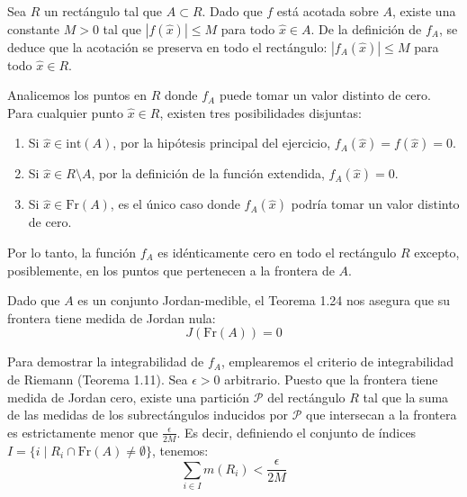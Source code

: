 \documentclass[11pt,letterpaper]{article}
\begin{document}
Sea $R$ un rectángulo tal que $A \subset R$. Dado que $f$ está acotada sobre $A$, existe una constante $M > 0$ tal que $|f(\hat{x})| \le M$ para todo $\hat{x} \in A$. De la definición de $f_A$, se deduce que la acotación se preserva en todo el rectángulo: $|f_A(\hat{x})| \le M$ para todo $\hat{x} \in R$.

Analicemos los puntos en $R$ donde $f_A$ puede tomar un valor distinto de cero. Para cualquier punto $\hat{x} \in R$, existen tres posibilidades disjuntas:
\begin{enumerate}
    \item Si $\hat{x} \in \text{int}(A)$, por la hipótesis principal del ejercicio, $f_A(\hat{x}) = f(\hat{x}) = 0$.
    \item Si $\hat{x} \in R \setminus A$, por la definición de la función extendida, $f_A(\hat{x}) = 0$.
    \item Si $\hat{x} \in \text{Fr}(A)$, es el único caso donde $f_A(\hat{x})$ podría tomar un valor distinto de cero.
\end{enumerate}

Por lo tanto, la función $f_A$ es idénticamente cero en todo el rectángulo $R$ excepto, posiblemente, en los puntos que pertenecen a la frontera de $A$.

Dado que $A$ es un conjunto Jordan-medible, el Teorema 1.24 nos asegura que su frontera tiene medida de Jordan nula:
\begin{equation*}
J(\text{Fr}(A)) = 0
\end{equation*}

Para demostrar la integrabilidad de $f_A$, emplearemos el criterio de integrabilidad de Riemann (Teorema 1.11). Sea $\epsilon > 0$ arbitrario. Puesto que la frontera tiene medida de Jordan cero, existe una partición $\mathcal{P}$ del rectángulo $R$ tal que la suma de las medidas de los subrectángulos inducidos por $\mathcal{P}$ que intersecan a la frontera es estrictamente menor que $\frac{\epsilon}{2M}$. Es decir, definiendo el conjunto de índices $I = \{i \mid R_i \cap \text{Fr}(A) \neq \emptyset\}$, tenemos:
\begin{equation*}
\sum_{i \in I} m(R_i) < \frac{\epsilon}{2M}
\end{equation*}
\end{document}
